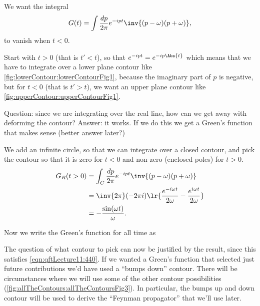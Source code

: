 We want the integral
\begin{equation}\label{eqn:qftLecture11:620}
G(t) = \int \frac{dp}{2 \pi} e^{-i p t}
\inv{(p - \omega)(p + \omega)},
\end{equation}
to vanish when \( t < 0 \).

Start with \( t > 0 \) (that is \( t' < t \)), so that \( e^{-i p t} = e^{-i p \Abs{t}} \) which means that we have to integrate over a lower plane contour like \cref{fig:lowerContour:lowerContourFig1}, because the imaginary part of \( p \) is negative, but for \( t < 0 \) (that is \( t' > t \)), we want an upper plane contour like \cref{fig:upperContour:upperContourFig1}.


Question: since we are integrating over the real line, how can we get away with deforming the contour?
Answer: it works.  If we do this we get a Green's function that makes sense (better answer later?)

We add an infinite circle, so that we can integrate over a closed contour, and pick the contour so that it is zero for \( t < 0 \) and non-zero (enclosed poles) for \( t > 0 \).
\begin{equation}\label{eqn:qftLecture11:640}
\begin{aligned}
G_R(t > 0)
&= \int_C \frac{dp}{2 \pi} e^{-i p t}
\inv{(p - \omega)(p + \omega)} \\
&=
\inv{2 \pi} (-2 \pi i) \lr{
   \frac{e^{-i \omega t}}{2 \omega}
   -
   \frac{e^{i \omega t}}{2 \omega}
} \\
&=
-\frac{\sin(\omega t)}{\omega}.
\end{aligned}
\end{equation}

Now we write the Green's function for all time as

The question of what contour to pick can now be justified by the result, since this satisfies \cref{eqn:qftLecture11:440}.  If we wanted a Green's function that selected just future contributions we'd have used a ``bumps down'' contour.  There will be circumstances where we will use some of the other contour possibilities (\cref{fig:allTheContours:allTheContoursFig3}).  In particular, the bumps up and down contour will be used to derive the ``Feynman propagator'' that we'll use later.

